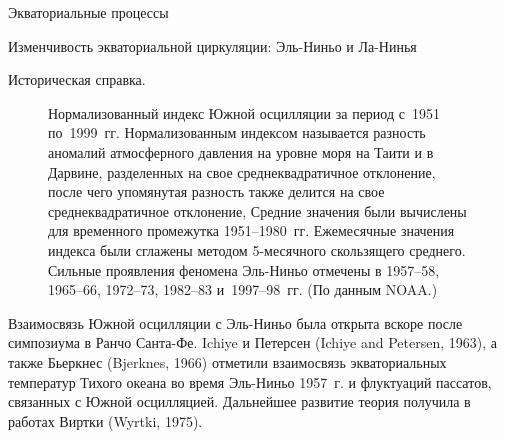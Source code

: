 \begin{chapter}{Экваториальные процессы}
\begin{section}{Изменчивость экваториальной циркуляции: Эль-Ниньо и Ла-Нинья}
\begin{paragraph}{Историческая справка.}
\begin{figure}[t!]
\caption{Нормализованный индекс Южной осцилляции за период с~1951
по~1999~гг. Нормализованным индексом называется разность аномалий атмосферного
давления на уровне моря на Таити и в Дарвине, разделенных на свое 
среднеквадратичное отклонение, после чего упомянутая разность также делится
на свое среднеквадратичное отклонение, 
Средние значения были вычислены для временного промежутка 1951--1980~гг. 
Ежемесячные значения индекса были сглажены методом 5-месячного скользящего 
среднего. Сильные проявления феномена Эль-Ниньо отмечены в 1957--58, 1965--66, 
1972--73, 1982--83 и~1997--98~гг. (По данным NOAA.)}
\label{fig:soi}
\end{figure}
%

Взаимосвязь Южной осцилляции с Эль-Ниньо
была открыта вскоре после симпозиума в Ранчо Санта-Фе. 
Ichiye и Петерсен (Ichiye and Petersen, 1963), 
а также Бьеркнес (Bjerknes, 1966) отметили взаимосвязь экваториальных
температур Тихого океана во время Эль-Ниньо 1957~г. и флуктуаций пассатов,
связанных с Южной осцилляцией. Дальнейшее развитие теория получила в работах
Виртки (Wyrtki, 1975).
%


\end{paragraph}
\end{section}
\end{chapter}
